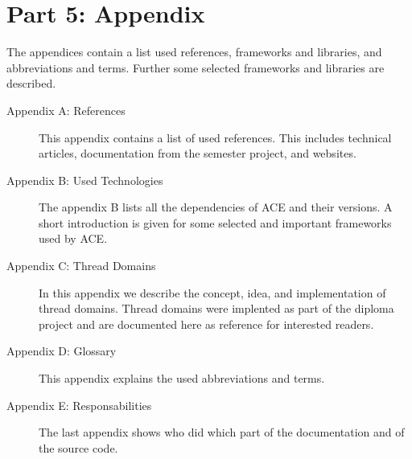  
\section*{Part 5: Appendix}
The appendices contain a list used references, frameworks and libraries, 
and abbreviations and terms. Further some selected frameworks and libraries
are described.

\begin{description}
 \item[Appendix A: References] This appendix contains a list of used references. This includes technical articles, documentation from the semester project, and websites.
 \item[Appendix B: Used Technologies] The appendix B lists all the dependencies of ACE and their versions. A short introduction is given for some selected and important frameworks used by ACE.
 \item[Appendix C: Thread Domains] In this appendix we describe the concept, idea, and implementation of thread domains. Thread domains were implented as part of the diploma project and are documented here as reference for interested readers.
 \item[Appendix D: Glossary] This appendix explains the used abbreviations and terms.
 \item[Appendix E: Responsabilities] The last appendix shows who did which part of the documentation and of the source code.
\end{description}
